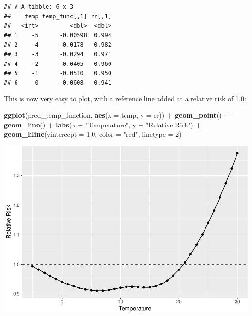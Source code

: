 \documentclass[
]{book}
\newenvironment{Shaded}{\begin{snugshade}}{\end{snugshade}}
\newcommand{\DataTypeTok}[1]{\textcolor[rgb]{0.13,0.29,0.53}{#1}}
\newcommand{\DecValTok}[1]{\textcolor[rgb]{0.00,0.00,0.81}{#1}}
\newcommand{\FloatTok}[1]{\textcolor[rgb]{0.00,0.00,0.81}{#1}}
\newcommand{\KeywordTok}[1]{\textcolor[rgb]{0.13,0.29,0.53}{\textbf{#1}}}
\newcommand{\NormalTok}[1]{#1}
\newcommand{\OperatorTok}[1]{\textcolor[rgb]{0.81,0.36,0.00}{\textbf{#1}}}
\newcommand{\StringTok}[1]{\textcolor[rgb]{0.31,0.60,0.02}{#1}}
\begin{document}
\begin{Shaded}
\end{Shaded}

\begin{verbatim}
## # A tibble: 6 x 3
##    temp temp_func[,1] rr[,1]
##   <int>         <dbl>  <dbl>
## 1    -5      -0.00598  0.994
## 2    -4      -0.0178   0.982
## 3    -3      -0.0294   0.971
## 4    -2      -0.0405   0.960
## 5    -1      -0.0510   0.950
## 6     0      -0.0608   0.941
\end{verbatim}

This is now very easy to plot, with a reference line added at a relative risk of 1.0:

\begin{Shaded}
\begin{Highlighting}[]
\KeywordTok{ggplot}\NormalTok{(pred_temp_function, }\KeywordTok{aes}\NormalTok{(}\DataTypeTok{x =}\NormalTok{ temp, }\DataTypeTok{y =}\NormalTok{ rr)) }\OperatorTok{+}\StringTok{ }
\StringTok{  }\KeywordTok{geom_point}\NormalTok{() }\OperatorTok{+}\StringTok{ }
\StringTok{  }\KeywordTok{geom_line}\NormalTok{() }\OperatorTok{+}\StringTok{ }
\StringTok{  }\KeywordTok{labs}\NormalTok{(}\DataTypeTok{x =} \StringTok{"Temperature"}\NormalTok{, }
       \DataTypeTok{y =} \StringTok{"Relative Risk"}\NormalTok{) }\OperatorTok{+}\StringTok{ }
\StringTok{  }\KeywordTok{geom_hline}\NormalTok{(}\DataTypeTok{yintercept =} \FloatTok{1.0}\NormalTok{, }\DataTypeTok{color =} \StringTok{"red"}\NormalTok{, }\DataTypeTok{linetype =} \DecValTok{2}\NormalTok{)}
\end{Highlighting}
\end{Shaded}

\includegraphics{adv_epi_analysis_files/figure-latex/unnamed-chunk-73-1.pdf}
\end{document}
